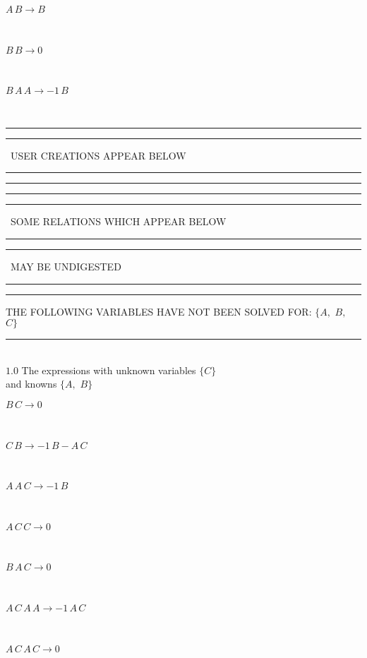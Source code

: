 \documentclass[rep10,leqno]{report}
\begin{document}
\begin{minipage}{6in}
$
A\,
 B\rightarrow B
$
\end{minipage}\medskip \\
\begin{minipage}{6in}
$
B\,
 B\rightarrow 0
$
\end{minipage}\medskip \\
\begin{minipage}{6in}
$
B\,
 A\,
 A\rightarrow -1\,
 B
$
\end{minipage}\\
\rule[2pt]{6in}{1pt}\hfil\break
\rule[2.5pt]{1.701in}{1pt}
\ USER CREATIONS APPEAR BELOW\ 
\rule[2.5pt]{1.701in}{1pt}\hfil\break
\rule[2pt]{6in}{1pt}\hfil\break
\rule[2pt]{6in}{4pt}\hfil\break
\rule[2pt]{1.45in}{4pt}
\ SOME RELATIONS WHICH APPEAR BELOW\ 
\rule[2pt]{1.45in}{4pt}\hfil\break
\rule[2pt]{2.18in}{4pt}
\ MAY BE UNDIGESTED\ 
\rule[2pt]{2.18in}{4pt}\hfil\break
\rule[2pt]{6in}{4pt}\hfil\break
THE FOLLOWING VARIABLES HAVE NOT BEEN SOLVED FOR:\hfil\break
$\{A,
$ $
B,
$ $
C\}$
\smallskip\\
\rule[3pt]{6in}{.7pt}\\
$1.0$  The expressions with unknown variables $\{C\}$\\
and knowns $\{A,
$ $
B\}$\smallskip\\
\begin{minipage}{6in}
$
B\,
 C\rightarrow 0
$
\end{minipage}\medskip \\
\begin{minipage}{6in}
$
C\,
 B\rightarrow -1\,
 B - A\,
 C
$
\end{minipage}\medskip \\
\begin{minipage}{6in}
$
A\,
 A\,
 C\rightarrow -1\,
 B
$
\end{minipage}\medskip \\
\begin{minipage}{6in}
$
A\,
 C\,
 C\rightarrow 0
$
\end{minipage}\medskip \\
\begin{minipage}{6in}
$
B\,
 A\,
 C\rightarrow 0
$
\end{minipage}\medskip \\
\begin{minipage}{6in}
$
A\,
 C\,
 A\,
 A\rightarrow -1\,
 A\,
 C
$
\end{minipage}\medskip \\
\begin{minipage}{6in}
$
A\,
 C\,
 A\,
 C\rightarrow 0
$
\end{minipage}\\
\vspace{10pt}
\end{document}
